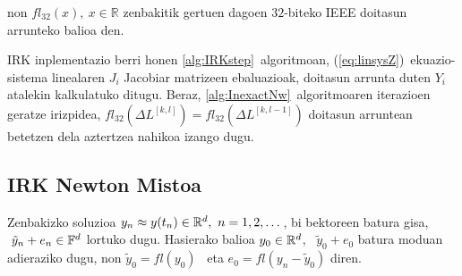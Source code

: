 non $fl_{32}(x), \ x \in \mathbb{R}$ zenbakitik gertuen dagoen $32$-biteko IEEE doitasun arrunteko balioa den.

IRK inplementazio berri honen \ref{alg:IRKstep}~algoritmoan, (\ref{eq:linsysZ})~ekuazio-sistema linealaren  $J_i$ Jacobiar matrizeen ebaluazioak, doitasun arrunta duten $Y_i$ atalekin kalkulatuko ditugu. Beraz, \ref{alg:InexactNw}~algoritmoaren iterazioen geratze irizpidea, $fl_{32}(\Delta L^{[k,l]})=fl_{32}(\Delta L^{[k,l-1]})$ doitasun arruntean betetzen dela aztertzea nahikoa izango dugu.  

\subsection{IRK Newton Mistoa}
\label{ss:ss762}

Zenbakizko soluzioa $y_n \approx y(t_n) \in \mathbb{R}^{d}, \ n=1,2,\dots$, bi bektoreen batura gisa, $ \ \tilde{y}_n+e_n \in \mathbb{F}^{d}$ lortuko dugu. Hasierako balioa $y_0 \in \mathbb{R}^{d}$, \ $\tilde{y}_0+e_0$ batura moduan adieraziko dugu, non $\tilde{y}_0=fl(y_0)$~ eta $e_0=fl(y_n-\tilde{y}_0)$ diren. 

